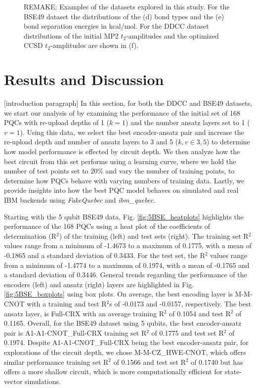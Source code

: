 \documentclass[journal=jacsat,manuscript=article]{achemso}
\begin{document}
\begin{figure}[H]
\begin{subfigure}[b]{0.3\textwidth}
		\caption{}
		\label{fig:waterddccdistribution}
	\end{subfigure}	
	\caption{REMAKE: Examples of the datasets explored in this study. For the BSE49 dataset the distributions of the (d) bond types and the (e) bond separation energies in kcal/mol. For the DDCC dataset distributions of the initial MP2 $t_{2}$-amplitudes and the optimized CCSD $t_{2}$-amplitudes are shown in (f).}
	\label{fig:bse_data}
\end{figure}





\section{Results and Discussion}
\label{section:results_and_discussion}
[introduction paragraph]
In this section, for both the DDCC and BSE49 datasets, we start our analysis of by examining the performance of the initial set of 168 PQCs with re-upload depths of 1 ($k=1$) and the number ansatz layers set to 1 ($v=1$).
Using this data, we select the best encoder-ansatz pair and increase the re-upload depth and number of ansatz layers to 3 and 5 ($k,v \in {3,5}$) to determine how model performance is effected by circuit depth.
We then analyze how the best circuit from this set performs using a learning curve, where we hold the number of test points set to 20\% and vary the number of training points, to determine how PQCs behave with varying numbers of training data.
Lastly, we provide insights into how the best PQC model behaves on simulated and real IBM backends using \textit{FakeQuebec} and \textit{ibm{\_}quebec}.


Starting with the 5 qubit BSE49 data, Fig. \ref{fig:5BSE_heatplots} highlights the performance of the 168 PQCs using a heat plot of the coefficients of determination (R$^{2}$) of the training (left) and test sets (right).
The training set R$^2$ values range from a minimum of -1.4673 to a maximum of 0.1775, with a mean of -0.1865 and a standard deviation of 0.3433. 
For the test set, the R$^2$ values range from a minimum of -1.4774 to a maximum of 0.1974, with a mean of -0.1765 and a standard deviation of 0.3446.
General trends regarding the performance of the encoders (left) and ansatz (right) layers are highlighted in Fig. \ref{fig:5BSE_boxplots} using box plots.
On average, the best encoding layer is M-M-CNOT with a training and test R$^{2}$s of -0.0173 and -0.0157, respectively.
The best ansatz layer, is Full-CRX with an average training  R$^{2}$ of 0.1054 and test R$^{2}$ of 0.1165.
Overall, for the BSE49 dataset using 5 qubits, the best encoder-ansatz pair is A1-A1-CNOT{\_}Full-CRX training set R$^{2}$ of 0.1775 and test set R$^{2}$ of 0.1974.
Despite A1-A1-CNOT{\_}Full-CRX being the best encoder-ansatz pair, for explorations of the circuit depth, we chose M-M-CZ{\_}HWE-CNOT, which offers similar performance training set R$^{2}$ of 0.1566 and test set R$^{2}$ of 0.1740 but has offers a more shallow circuit, which is more computationally efficient for state-vector simulations.
\end{document}
